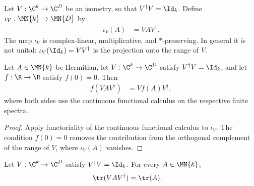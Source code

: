 \begin{definition}
    \label{def:isometric_nonunital_conjugation}
    \leanok
    Let $V:\C^k\to\C^D$ be an isometry, so that
    $V^\dagger V=\Id_k$. Define $\iota_V:\MN{k}\to\MN{D}$ by
    \begin{align}
        \iota_V(A) & =VAV^\dagger.
        \label{eq:mpdo_isometric_conjugation}
    \end{align}
    The map $\iota_V$ is complex-linear, multiplicative, and $*$-preserving.
    In general it is not unital:
    $\iota_V(\Id_k)=VV^\dagger$ is the projection onto the range of $V$.
\end{definition}

\begin{theorem}
    \label{thm:cfc_rectangular_isometry_zero}
    \leanok
    Let $A\in\MN{k}$ be Hermitian, let $V:\C^k\to\C^D$ satisfy
    $V^\dagger V=\Id_k$, and let $f:\R\to\R$ satisfy $f(0)=0$. Then
    \begin{align}
        f(VAV^\dagger) & =Vf(A)V^\dagger,
        \label{eq:mpdo_cfc_isometric_conjugation}
    \end{align}
    where both sides use the continuous functional calculus on the respective
    finite spectra.
\end{theorem}

\begin{proof}\leanok
    Apply functoriality of the continuous functional calculus to
    $\iota_V$. The condition $f(0)=0$ removes the contribution from the
    orthogonal complement of the range of $V$, where $\iota_V(A)$ vanishes.
\end{proof}

\begin{theorem}
    \label{thm:isometric_embedding_trace}
    \leanok
    Let $V:\C^k\to\C^D$ satisfy $V^\dagger V=\Id_k$. For every
    $A\in\MN{k}$,
    \begin{align}
        \tr(VAV^\dagger) & =\tr(A).
        \label{eq:mpdo_isometric_trace}
    \end{align}
\end{theorem}


